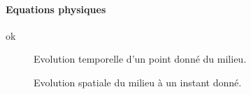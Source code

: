 \paragraph{Equations physiques}
ok
\begin{figure}[h]
    \centering
    \begin{minipage}{0.45\textwidth}
        \centering
        \caption{Evolution temporelle d'un point donné du milieu.~\cite{propagation-onde}}
    \end{minipage}
    \hfill
    \begin{minipage}{0.45\textwidth}
        \centering
        \caption{Evolution spatiale du milieu à un instant donné.~\cite{propagation-onde}}
    \end{minipage}
\end{figure}

